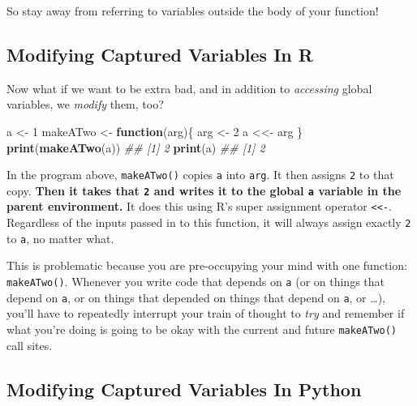 \documentclass[12pt,krantz2]{krantz}
\makeatletter
\newenvironment{Shaded}{\begin{snugshade}}{\end{snugshade}}
\newcommand{\CommentTok}[1]{\textcolor[rgb]{0.37,0.37,0.37}{\textit{#1}}}
\newcommand{\ControlFlowTok}[1]{\textcolor[rgb]{0.27,0.27,0.27}{\textbf{#1}}}
\newcommand{\DecValTok}[1]{\textcolor[rgb]{0.06,0.06,0.06}{#1}}
\newcommand{\KeywordTok}[1]{\textcolor[rgb]{0.27,0.27,0.27}{\textbf{#1}}}
\newcommand{\NormalTok}[1]{#1}
\newcommand{\StringTok}[1]{\textcolor[rgb]{0.5,0.5,0.5}{#1}}
\newenvironment{kframe}{%
\medskip{}
\setlength{\fboxsep}{.8em}
 \def\at@end@of@kframe{}%
 \ifinner\ifhmode%
  \def\at@end@of@kframe{\end{minipage}}%
  \begin{minipage}{\columnwidth}%
 \fi\fi%
 \def\FrameCommand##1{\hskip\@totalleftmargin \hskip-\fboxsep
 \colorbox{shadecolor}{##1}\hskip-\fboxsep
     \hskip-\linewidth \hskip-\@totalleftmargin \hskip\columnwidth}%
 \MakeFramed {\advance\hsize-\width
   \@totalleftmargin\z@ \linewidth\hsize
   \@setminipage}}%
 {\par\unskip\endMakeFramed%
 \at@end@of@kframe}
\renewenvironment{Shaded}{\begin{kframe}}{\end{kframe}}
\makeatother
\begin{document}
So stay away from referring to variables outside the body of your function!

\hypertarget{modifying-captured-variables-in-r}{%
\subsection{Modifying Captured Variables In R}\label{modifying-captured-variables-in-r}}

Now what if we want to be extra bad, and in addition to \emph{accessing} global variables, we \emph{modify} them, too?

\begin{Shaded}
\begin{Highlighting}[]
\NormalTok{a <-}\StringTok{ }\DecValTok{1}
\NormalTok{makeATwo <-}\StringTok{ }\ControlFlowTok{function}\NormalTok{(arg)\{}
\NormalTok{  arg <-}\StringTok{ }\DecValTok{2}
\NormalTok{  a <<-}\StringTok{ }\NormalTok{arg}
\NormalTok{\}}
\KeywordTok{print}\NormalTok{(}\KeywordTok{makeATwo}\NormalTok{(a))}
\CommentTok{## [1] 2}
\KeywordTok{print}\NormalTok{(a)}
\CommentTok{## [1] 2}
\end{Highlighting}
\end{Shaded}

In the program above, \texttt{makeATwo()} copies \texttt{a} into \texttt{arg}. It then assigns \texttt{2} to that copy. \textbf{Then it takes that \texttt{2} and writes it to the global \texttt{a} variable in the parent environment.} It does this using R's super assignment operator \texttt{\textless{}\textless{}-}. Regardless of the inputs passed in to this function, it will always assign exactly \texttt{2} to \texttt{a}, no matter what.

This is problematic because you are pre-occupying your mind with one function: \texttt{makeATwo()}. Whenever you write code that depends on \texttt{a} (or on things that depend on \texttt{a}, or on things that depended on things that depend on \texttt{a}, or \ldots{}), you'll have to repeatedly interrupt your train of thought to \emph{try} and remember if what you're doing is going to be okay with the current and future \texttt{makeATwo()} call sites.

\hypertarget{modifying-captured-variables-in-python}{%
\subsection{Modifying Captured Variables In Python}\label{modifying-captured-variables-in-python}}
\end{document}
